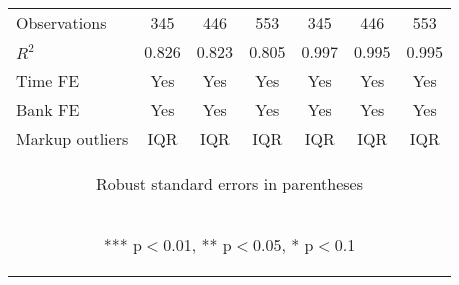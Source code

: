 \documentclass[]{article}
\begin{document}
\begin{center}
\begin{tabular}{lcccccc}
Observations & 345 & 446 & 553 & 345 & 446 & 553 \\
$R^2$ & 0.826 & 0.823 & 0.805 & 0.997 & 0.995 & 0.995 \\
Time FE & Yes & Yes & Yes & Yes & Yes & Yes \\
Bank FE & Yes & Yes & Yes & Yes & Yes & Yes \\
 Markup outliers & IQR & IQR & IQR & IQR & IQR & IQR \\ \hline
\multicolumn{7}{c}{\begin{footnotesize} Robust standard errors in parentheses\end{footnotesize}} \\
\multicolumn{7}{c}{\begin{footnotesize} *** p$<$0.01, ** p$<$0.05, * p$<$0.1\end{footnotesize}} \\
\end{tabular}
\end{center}
\end{document}
